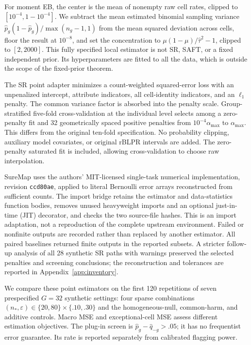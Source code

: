 \documentclass[Afour,sageh,times,doublespace]{sagej}
\begin{document}
For moment EB, the center is the mean of nonempty raw cell rates, clipped to $[10^{-4},1-10^{-4}]$. We subtract the mean estimated binomial sampling variance $\widehat p_g(1-\widehat p_g)/\max(n_g-1,1)$ from the mean squared deviation across cells, floor the result at $10^{-8}$, and set the concentration to $\mu(1-\mu)/\widehat\tau^2-1$, clipped to $[2,2000]$. This fully specified local estimator is not SR, SAFT, or a fixed independent prior. Its hyperparameters are fitted to all the data, which is outside the scope of the fixed-prior theorem.

The SR point adapter minimizes a count-weighted squared-error loss with an unpenalized intercept, attribute indicators, all cell-identity indicators, and an $\ell_1$ penalty. The common variance factor is absorbed into the penalty scale. Group-stratified five-fold cross-validation at the individual level selects among a zero-penalty fit and 32 geometrically spaced positive penalties from $10^{-4}\alpha_{\max}$ to $\alpha_{\max}$. This differs from the original ten-fold specification. No probability clipping, auxiliary model covariates, or original rBLPR intervals are added. The zero-penalty saturated fit is included, allowing cross-validation to choose raw interpolation.

SureMap uses the authors' MIT-licensed single-task numerical implementation, revision \texttt{ccd80ae}, applied to literal Bernoulli error arrays reconstructed from sufficient counts. The import bridge retains the estimator and data-statistics function bodies, removes unused heavyweight imports and an optional just-in-time (JIT) decorator, and checks the two source-file hashes. This is an import adaptation, not a reproduction of the complete upstream environment. Failed or nonfinite outputs are recorded rather than replaced by another estimator. All paired baselines returned finite outputs in the reported subsets. A stricter follow-up analysis of all 28 synthetic SR paths with warnings preserved the selected penalties and screening conclusions; the reconstruction and tolerances are reported in Appendix~\ref{app:inventory}.

We compare these point estimators on the first 120 repetitions of seven prespecified $G=32$ synthetic settings: four sparse combinations $(n_*,\varepsilon)\in\{20,80\}\times\{.10,.30\}$ and the homogeneous-null, common-harm, and additive controls. Macro MSE and exceptional-cell MSE assess different estimation objectives. The plug-in screen is $\widehat p_g-\widehat q_{-g}>.05$; it has no frequentist error guarantee. Its rate is reported separately from calibrated flagging power.
\end{document}

